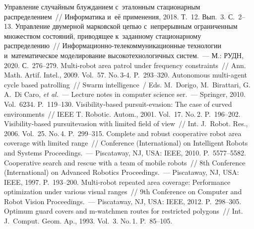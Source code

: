 \begin{multicols}{2}
\vspace*{-6pt}
  
{\small\frenchspacing
 {%
 \begin{thebibliography}{99}
 
 \vspace*{-2pt}
 
 
 Управление случайным блужданием с~эталонным 
стационарным распределением~// Информатика и~её применения, 2018. Т.~12. Вып.~3. 
С.~2--13. 
 Управ\-ле\-ние двумерной 
марковской \mbox{цепью} с~непрерывным ограниченным множеством со\-сто\-яний, приводящее 
к~заданному стационарному распределению~//  
Ин\-фор\-ма\-ци\-он\-но-те\-ле\-ком\-му\-ни\-ка\-ци\-он\-ные технологии и~математическое 
моделирование высокотехнологичных систем.~--- М.: РУДН, 2020. С.~276--279. 
 Multi-robot area patrol under frequency constraints~// 
Ann. Math. Artif. Intel., 2009. Vol.~57. No.\,3-4. P.~293--320. 
 Autonomous multi-agent cycle based patrolling~//  
 Swarm intelligence~/ Eds. M.~Dorigo, M.~Birattari, G.\,A.~Di Caro, \textit{et al.}~--- Lecture notes in 
computer science ser.~--- Springer, 2010. Vol.~6234. P.~119--130. 
 Visibility-based pursuit-evasion: The case of curved 
environments~// IEEE T. Robotic. Autom., 2001. Vol.~17. No.\,2. P.~196--202. 
 Visibility-based pursuitevasion with limited field of 
view~// Int. J.~Robot. Res., 2006. Vol.~25. No.\,4. P.~299--315. 
 Complete and robust cooperative 
robot area coverage with limited range~// Conference (International) on 
Intelligent Robots and Systems Proceedings.~--- Piscataway, NJ, USA: IEEE, 2010. P.~5577--5582. 
 Cooperative search and rescue with a team of mobile 
robots~// 8th Conference (International) on Advanced Robotics Proceedings.~--- Piscataway, NJ, 
USA: IEEE, 1997. P.~193--200.
 Multi-robot repeated area coverage: Performance 
optimization under various visual ranges~// 9th Conference on Computer and Robot Vision 
Proceedings.~--- Piscataway, NJ, USA: IEEE, 2012. P.~298--305. 
 Optimum guard covers and m-watchmen routes 
for restricted polygons~// Int. J.~Comput. Geom. Ap., 1993. Vol.~3. No.\,1. 
P.~85--105. 


\end{thebibliography}}}
\end{multicols}
